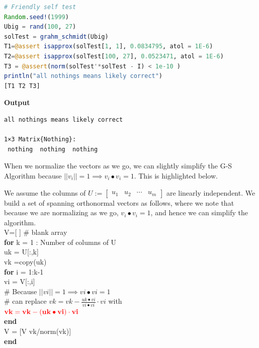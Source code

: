 \begin{lstlisting}[language=Julia,style=mystyle]
# Friendly self test
Random.seed!(1999)
Ubig = rand(100, 27)
solTest = grahm_schmidt(Ubig)
T1=@assert isapprox(solTest[1, 1], 0.0834795, atol = 1E-6)
T2=@assert isapprox(solTest[100, 27], 0.0523471, atol = 1E-6)
T3 = @assert(norm(solTest'*solTest - I) < 1e-10 )
println("all nothings means likely correct")
[T1 T2 T3]
\end{lstlisting}
\textbf{Output} 
\begin{verbatim}
all nothings means likely correct

1×3 Matrix{Nothing}:
 nothing  nothing  nothing
\end{verbatim}

When we normalize the vectors as we go, we can slightly simplify the G-S Algorithm because $||v_i|| = 1 \implies v_i \bullet v_i = 1$. This is highlighted below. \\

\begin{tcolorbox}[ title=\textbf{\Large Gram-Schmidt Process as Pseudocode: \textcolor{red}{Take 2}}]

We assume the columns of $U:=\left[ \begin{array}{cccc} u_1 & u_2 & \cdots  & u_m \end{array} \right] $
are linearly independent. We build a set of spanning orthonormal vectors as follows, where we note that because we are normalizing as we go, $v_i \bullet v_i = 1$, and hence we can simplify the algorithm.\\

{\rm 
V=[ ] \# blank array\\
\textbf{for} k = 1 : Number of columns of U\\
\hspace*{1cm} uk = U[:,k]\\
\hspace*{1cm} vk =copy(uk)\\
\hspace*{1cm} \textbf{for} i = 1:k-1\\
\hspace*{2cm} vi = V[:,i]\\
\hspace*{2cm} \# Because $||vi|| = 1 \implies vi \bullet vi = 1$ \\
\hspace*{2cm} \# can replace ${vk = vk - \frac{  uk \bullet vi}{vi \bullet vi}  \cdot vi}$ with \\
\hspace*{2cm} $\textcolor{red}{\bf vk = vk - (uk \bullet vi) \cdot vi}$\\
\hspace*{1cm} \textbf{end}\\
\hspace*{1cm} V = [V vk/norm(vk)] \\
\textbf{end}
}
\end{tcolorbox}

